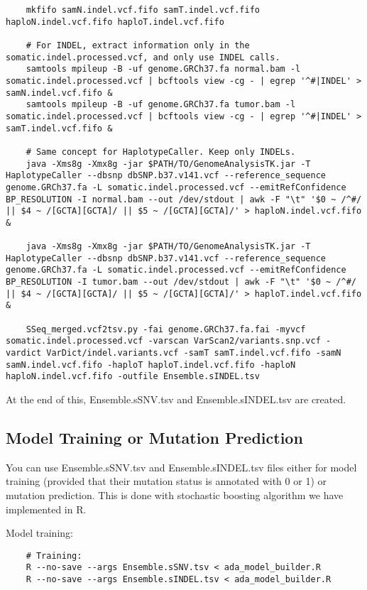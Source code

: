 \documentclass[10pt,letterpaper]{article}
\begin{document}
	\begin{lstlisting}
	mkfifo samN.indel.vcf.fifo samT.indel.vcf.fifo haploN.indel.vcf.fifo haploT.indel.vcf.fifo

	# For INDEL, extract information only in the somatic.indel.processed.vcf, and only use INDEL calls.
	samtools mpileup -B -uf genome.GRCh37.fa normal.bam -l somatic.indel.processed.vcf | bcftools view -cg - | egrep '^#|INDEL' > samN.indel.vcf.fifo &
	samtools mpileup -B -uf genome.GRCh37.fa tumor.bam -l somatic.indel.processed.vcf | bcftools view -cg - | egrep '^#|INDEL' > samT.indel.vcf.fifo &

	# Same concept for HaplotypeCaller. Keep only INDELs.
	java -Xms8g -Xmx8g -jar $PATH/TO/GenomeAnalysisTK.jar -T HaplotypeCaller --dbsnp dbSNP.b37.v141.vcf --reference_sequence genome.GRCh37.fa -L somatic.indel.processed.vcf --emitRefConfidence BP_RESOLUTION -I normal.bam --out /dev/stdout | awk -F "\t" '$0 ~ /^#/ || $4 ~ /[GCTA][GCTA]/ || $5 ~ /[GCTA][GCTA]/' > haploN.indel.vcf.fifo &

	java -Xms8g -Xmx8g -jar $PATH/TO/GenomeAnalysisTK.jar -T HaplotypeCaller --dbsnp dbSNP.b37.v141.vcf --reference_sequence genome.GRCh37.fa -L somatic.indel.processed.vcf --emitRefConfidence BP_RESOLUTION -I tumor.bam --out /dev/stdout | awk -F "\t" '$0 ~ /^#/ || $4 ~ /[GCTA][GCTA]/ || $5 ~ /[GCTA][GCTA]/' > haploT.indel.vcf.fifo &
		
	SSeq_merged.vcf2tsv.py -fai genome.GRCh37.fa.fai -myvcf somatic.indel.processed.vcf -varscan VarScan2/variants.snp.vcf -vardict VarDict/indel.variants.vcf -samT samT.indel.vcf.fifo -samN samN.indel.vcf.fifo -haploT haploT.indel.vcf.fifo -haploN haploN.indel.vcf.fifo -outfile Ensemble.sINDEL.tsv
	\end{lstlisting}

	
	At the end of this, Ensemble.sSNV.tsv and Ensemble.sINDEL.tsv are created. 



	\subsection{Model Training or Mutation Prediction}

	You can use Ensemble.sSNV.tsv and Ensemble.sINDEL.tsv files either for model training (provided that their mutation status is annotated with 0 or 1) or mutation prediction. This is done with stochastic boosting algorithm we have implemented in R. 
	
	Model training:
	\begin{lstlisting}
	# Training:
	R --no-save --args Ensemble.sSNV.tsv < ada_model_builder.R
	R --no-save --args Ensemble.sINDEL.tsv < ada_model_builder.R
	\end{lstlisting}
	
\end{document}
